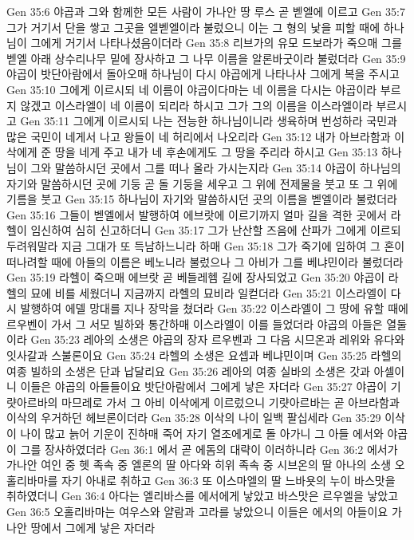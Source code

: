 Gen 35:6  야곱과 그와 함께한 모든 사람이 가나안 땅 루스 곧 벧엘에 이르고
Gen 35:7  그가 거기서 단을 쌓고 그곳을 엘벧엘이라 불렀으니 이는 그 형의 낯을 피할 때에 하나님이 그에게 거기서 나타나셨음이더라
Gen 35:8  리브가의 유모 드보라가 죽으매 그를 벧엘 아래 상수리나무 밑에 장사하고 그 나무 이름을 알론바굿이라 불렀더라
Gen 35:9  야곱이 밧단아람에서 돌아오매 하나님이 다시 야곱에게 나타나사 그에게 복을 주시고
Gen 35:10  그에게 이르시되 네 이름이 야곱이다마는 네 이름을 다시는 야곱이라 부르지 않겠고 이스라엘이 네 이름이 되리라 하시고 그가 그의 이름을 이스라엘이라 부르시고
Gen 35:11  그에게 이르시되 나는 전능한 하나님이니라 생육하며 번성하라 국민과 많은 국민이 네게서 나고 왕들이 네 허리에서 나오리라
Gen 35:12  내가 아브라함과 이삭에게 준 땅을 네게 주고 내가 네 후손에게도 그 땅을 주리라 하시고
Gen 35:13  하나님이 그와 말씀하시던 곳에서 그를 떠나 올라 가시는지라
Gen 35:14  야곱이 하나님의 자기와 말씀하시던 곳에 기둥 곧 돌 기둥을 세우고 그 위에 전제물을 붓고 또 그 위에 기름을 붓고
Gen 35:15  하나님이 자기와 말씀하시던 곳의 이름을 벧엘이라 불렀더라
Gen 35:16  그들이 벧엘에서 발행하여 에브랏에 이르기까지 얼마 길을 격한 곳에서 라헬이 임신하여 심히 신고하더니
Gen 35:17  그가 난산할 즈음에 산파가 그에게 이르되 두려워말라 지금 그대가 또 득남하느니라 하매
Gen 35:18  그가 죽기에 임하여 그 혼이 떠나려할 때에 아들의 이름은 베노니라 불렀으나 그 아비가 그를 베냐민이라 불렀더라
Gen 35:19  라헬이 죽으매 에브랏 곧 베들레헴 길에 장사되었고
Gen 35:20  야곱이 라헬의 묘에 비를 세웠더니 지금까지 라헬의 묘비라 일컫더라
Gen 35:21  이스라엘이 다시 발행하여 에델 망대를 지나 장막을 쳤더라
Gen 35:22  이스라엘이 그 땅에 유할 때에 르우벤이 가서 그 서모 빌하와 통간하매 이스라엘이 이를 들었더라 야곱의 아들은 열둘이라
Gen 35:23  레아의 소생은 야곱의 장자 르우벤과 그 다음 시므온과 레위와 유다와 잇사갈과 스불론이요
Gen 35:24  라헬의 소생은 요셉과 베냐민이며
Gen 35:25  라헬의 여종 빌하의 소생은 단과 납달리요
Gen 35:26  레아의 여종 실바의 소생은 갓과 아셀이니 이들은 야곱의 아들들이요 밧단아람에서 그에게 낳은 자더라
Gen 35:27  야곱이 기럇아르바의 마므레로 가서 그 아비 이삭에게 이르렀으니 기럇아르바는 곧 아브라함과 이삭의 우거하던 헤브론이더라
Gen 35:28  이삭의 나이 일백 팔십세라
Gen 35:29  이삭이 나이 많고 늙어 기운이 진하매 죽어 자기 열조에게로 돌 아가니 그 아들 에서와 야곱이 그를 장사하였더라
Gen 36:1  에서 곧 에돔의 대략이 이러하니라
Gen 36:2  에서가 가나안 여인 중 헷 족속 중 엘론의 딸 아다와 히위 족속 중 시브온의 딸 아나의 소생 오홀리바마를 자기 아내로 취하고
Gen 36:3  또 이스마엘의 딸 느바욧의 누이 바스맛을 취하였더니
Gen 36:4  아다는 엘리바스를 에서에게 낳았고 바스맛은 르우엘을 낳았고
Gen 36:5  오홀리바마는 여우스와 얄람과 고라를 낳았으니 이들은 에서의 아들이요 가나안 땅에서 그에게 낳은 자더라
